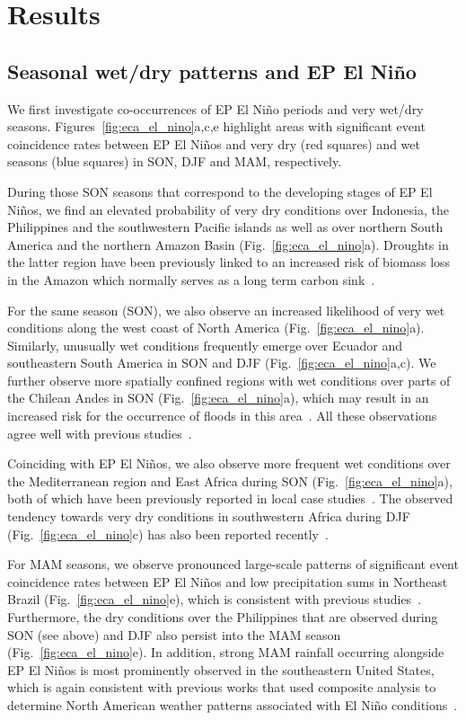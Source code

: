 \documentclass[utf8]{frontiersSCNS} %
\begin{document}
\section{Results}\label{sec:results}

\subsection{Seasonal wet/dry patterns and EP El Ni\~no}
\label{sec:ep_el_nino}

We first investigate co-occurrences of EP El Ni\~no periods and very wet/dry seasons. Figures~\ref{fig:eca_el_nino}a,c,e highlight areas with significant event coincidence rates between EP El Ni\~nos and very dry (red squares) and wet seasons (blue squares) in SON, DJF and MAM, respectively.

During those SON seasons that correspond to the developing stages of EP El Ni\~nos, we find an elevated probability of very dry conditions over Indonesia, the Philippines and the southwestern Pacific islands as well as over northern South America and the northern Amazon Basin (Fig.~\ref{fig:eca_el_nino}a). Droughts in the latter region have been previously linked to an increased risk of biomass loss in the Amazon which normally serves as a long term carbon sink~\citep{Phillips1344, lewis_2010_2011}.

For the same season (SON), we also observe an increased likelihood of very wet conditions along the west coast of North America (Fig.~\ref{fig:eca_el_nino}a). Similarly, unusually wet conditions frequently emerge over Ecuador and southeastern South America in SON and DJF (Fig.~\ref{fig:eca_el_nino}a,c). We further observe more spatially confined regions with wet conditions over parts of the Chilean Andes in SON (Fig.~\ref{fig:eca_el_nino}a), which may result in an increased risk for the occurrence of floods in this area~\citep{bookhagen2012spatiotemporal,boers2014prediction}. All these observations agree well with previous studies~\citep{diaz2001}.

Coinciding with EP El Ni\~nos, we also observe more frequent wet conditions over the Mediterranean region and East Africa during SON (Fig.~\ref{fig:eca_el_nino}a), both of which have been previously reported in local case studies~\citep{shaman2010, Camberlin2001}. The observed tendency towards very dry conditions in southwestern Africa during DJF (Fig.~\ref{fig:eca_el_nino}c) has also been reported recently~\citep{hoell2014}. 

For MAM seasons, we observe pronounced large-scale patterns of significant event coincidence rates between EP El Ni\~nos and low precipitation sums in Northeast Brazil (Fig.~\ref{fig:eca_el_nino}e), which is consistent with previous studies~\citep{kane1997prediction}. Furthermore, the dry conditions over the Philippines that are observed during SON (see above) and DJF also persist into the MAM season (Fig.~\ref{fig:eca_el_nino}e). In addition, strong MAM rainfall occurring alongside EP El Ni\~nos is most prominently observed in the southeastern United States, which is again consistent with previous works that used composite analysis to determine North American weather patterns associated with El Ni\~no conditions~\citep{ropelewski1986north}. 
\end{document}
